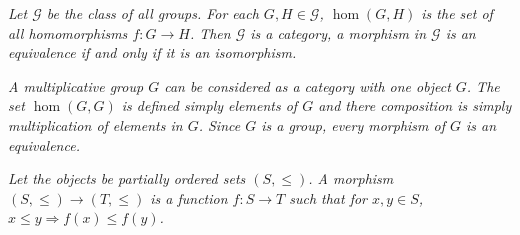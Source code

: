 \begin{example}\em
Let $\mathcal{G}$ be the class of all groups. For each $G,H\in\mathcal{G}$, $\hom(G,H)$ is the set of all homomorphisms $f:G\to H$. Then $\mathcal{G}$ is a category, a morphism in $\mathcal{G}$ is an equivalence if and only if it is an isomorphism.
\end{example}
\begin{example}\em
A multiplicative group $G$ can be considered as a category with one object $G$. The set $\hom(G,G)$ is defined simply elements of $G$ and there composition is simply multiplication of elements in $G$. Since $G$ is a group, every morphism of $G$ is an equivalence.
\end{example}
\begin{example}\em
Let the objects be partially ordered sets $(S,\le)$. A morphism $(S,\le)\to (T,\le)$ is a function $f:S\to T$ such that for $x,y\in S$, $x\le y\Rightarrow f(x)\le f(y)$.
\end{example}

